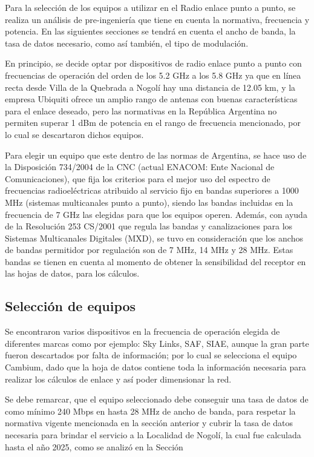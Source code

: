 \documentclass[12pt,a4paper]{book}
\begin{document}
Para la selección de los equipos a utilizar en el Radio enlace punto a punto, se realiza un análisis de pre-ingeniería que tiene en cuenta la normativa, frecuencia y potencia. En las siguientes secciones se tendrá en cuenta el ancho de banda, la tasa de datos necesario, como así también, el tipo de modulación.

En principio, se decide optar por dispositivos de radio enlace punto a punto con frecuencias de operación del orden de los 5.2 GHz a los 5.8 GHz ya que en línea recta desde Villa de la Quebrada a Nogolí hay una distancia de 12.05 km, y la empresa Ubiquiti ofrece un amplio rango de antenas con buenas características para el enlace deseado, pero las normativas en la República Argentina no permiten superar 1 dBm de potencia en el rango de frecuencia mencionado, por lo cual se descartaron dichos equipos.

Para elegir un equipo que este dentro de las normas de Argentina, se hace uso de la Disposición 734/2004 de la CNC (actual ENACOM: Ente Nacional de Comunicaciones), que fija los criterios para el mejor uso del espectro de frecuencias radioeléctricas atribuido al servicio fijo en bandas superiores a 1000 MHz (sistemas multicanales punto a punto), siendo las bandas incluidas en la frecuencia de 7 GHz las elegidas para que los equipos operen. Además, con ayuda de la Resolución 253 CS/2001 que regula las bandas y canalizaciones para los Sistemas Multicanales Digitales (MXD), se tuvo en consideración que los anchos de bandas permitidor por regulación son de 7 MHz, 14 MHz y 28 MHz. Estas bandas se tienen en cuenta al momento de obtener la sensibilidad del receptor en las hojas de datos, para los cálculos.


\subsection{Selección de equipos}

Se encontraron varios dispositivos en la frecuencia de operación elegida de diferentes marcas como por ejemplo: Sky Links, SAF, SIAE, aunque la gran parte fueron descartados por falta de información; por lo cual se selecciona el equipo Cambium, dado que la hoja de datos contiene toda la información necesaria para realizar los cálculos de enlace y así poder dimensionar la red.

Se debe remarcar, que el equipo seleccionado debe conseguir una tasa de datos de como mínimo 240 Mbps en hasta 28 MHz de ancho de banda, para respetar la normativa vigente mencionada en la sección anterior y cubrir la tasa de datos necesaria para brindar el servicio a la Localidad de Nogolí, la cual fue calculada hasta el año 2025, como se analizó en la Sección %
\end{document}

